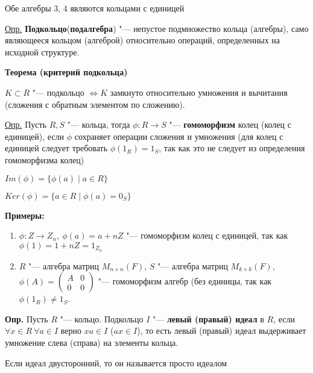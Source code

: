 \documentclass{article}
\begin{document}
Обе алгебры 3, 4 являются кольцами с единицей

\vspace{5pt}

\underline{Опр.} \textbf{Подкольцо}(\textbf{подалгебра}) "--- непустое подмножество кольца (алгебры), само являющееся кольцом (алгеброй) относительно операций, определенных на исходной структуре.

\vspace{10pt}

\textbf{Теорема (критерий подкольца)}

$K \subset R$ "--- подкольцо $\Leftrightarrow K$ замкнуто относительно умножения и вычитания (сложения с обратным элементом по сложению).

\vspace{5pt}

\underline{Опр.} Пусть $R, S$ "--- кольца, тогда $\phi: R \rightarrow S$ "--- \textbf{гомоморфизм} колец (колец с единицей), если $\phi$ сохраняет операции сложения и умножения (для колец с единицей следует требовать $\phi(1_R) = 1_S$, так как это не следует из определения гомоморфизма колец)

$Im(\phi) = \{\phi(a) \mid a \in R\}$

$Ker(\phi) = \{a \in R \mid \phi(a) = 0_S\}$

\vspace{5pt}

\textbf{Примеры:}
\begin{enumerate}
	\item $\phi: Z \rightarrow Z_n, \ \phi(a) = a + nZ$ "--- гомоморфизм колец с единицей, так как $\phi(1) = 1 + nZ = 1_{Z_n}$
	\item $R$ "--- алгебра матриц $M_{n \times n}(F)$, $S$ "--- алгебра матриц $M_{k \times k}(F)$, $\phi(A) = \begin{pmatrix} 
	A & 0 \\
	0 & 0 \end{pmatrix}$ "--- гомоморфизм алгебр (без единицы, так как $\phi(1_R) \neq 1_S$.
\end{enumerate} 

\vspace{5pt}

\textbf{Опр.} Пусть $R$ "--- кольцо. Подкольцо $I$ "--- \textbf{левый (правый) идеал} в $R$, если $\forall x \in R \ \forall a \in I$ верно $xa \in I$ ($ax \in I$), то есть левый (правый) идеал выдерживает умножение слева (справа) на элементы кольца.

Если идеал двусторонний, то он называется просто идеалом
\end{document}
